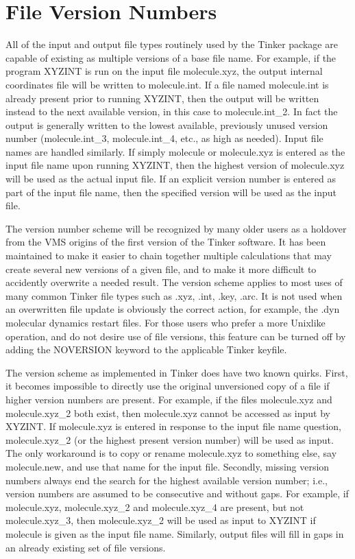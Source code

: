 \documentclass[letterpaper,11pt,english]{sphinxmanual}
\begin{document}
\section{File  Version Numbers}
\label{\detokenize{text/special-features:file-version-numbers}}
All of the input and output file types routinely used by the Tinker package are capable of existing as multiple versions of a base file name. For example, if the program XYZINT is run on the input file molecule.xyz, the output internal coordinates file will be written to molecule.int. If a file named molecule.int is already present prior to running XYZINT, then the output will be written instead to the next available version, in this case to molecule.int\_2. In fact the output is generally written to the lowest available, previously unused version number (molecule.int\_3, molecule.int\_4, etc., as high as needed). Input file names are handled similarly. If simply molecule or molecule.xyz is entered as the input file name upon running XYZINT, then the highest version of molecule.xyz will be used as the actual input file. If an explicit version number is entered as part of the input file name, then the specified version will be used as the input file.

The version number scheme will be recognized by many older users as a holdover from the VMS origins of the first version of the Tinker software. It has been maintained to make it easier to chain together multiple calculations that may create several new versions of a given file, and to make it more difficult to accidently overwrite a needed result. The version scheme applies to most uses of many common Tinker file types such as .xyz, .int, .key, .arc. It is not used when an overwritten file update is obviously the correct action, for example, the .dyn molecular dynamics restart files. For those users who prefer a more Unix\sphinxhyphen{}like operation, and do not desire use of file versions, this feature can be turned off by adding the NOVERSION keyword to the applicable Tinker keyfile.

The version scheme as implemented in Tinker does have two known quirks. First, it becomes impossible to directly use the original unversioned copy of a file if higher version numbers are present. For example, if the files molecule.xyz and molecule.xyz\_2 both exist, then molecule.xyz cannot be accessed as input by XYZINT. If molecule.xyz is entered in response to the input file name question, molecule.xyz\_2 (or the highest present version number) will be used as input. The only workaround is to copy or rename molecule.xyz to something else, say molecule.new, and use that name for the input file. Secondly, missing version numbers always end the search for the highest available version number; i.e., version numbers are assumed to be consecutive and without gaps. For example, if molecule.xyz, molecule.xyz\_2 and molecule.xyz\_4 are present, but not molecule.xyz\_3, then molecule.xyz\_2 will be used as input to XYZINT if molecule is given as the input file name. Similarly, output files will fill in gaps in an already existing set of file versions.
\end{document}
